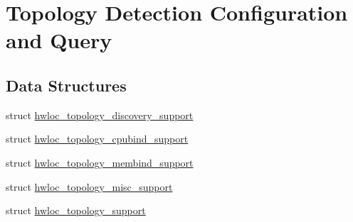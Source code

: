 \hypertarget{a00193}{}\section{Topology Detection Configuration and Query}
\label{a00193}
\subsection*{Data Structures}
\begin{DoxyCompactItemize}
\item 
struct \hyperlink{a00290}{hwloc\+\_\+topology\+\_\+discovery\+\_\+support}
\item 
struct \hyperlink{a00294}{hwloc\+\_\+topology\+\_\+cpubind\+\_\+support}
\item 
struct \hyperlink{a00298}{hwloc\+\_\+topology\+\_\+membind\+\_\+support}
\item 
struct \hyperlink{a00302}{hwloc\+\_\+topology\+\_\+misc\+\_\+support}
\item 
struct \hyperlink{a00306}{hwloc\+\_\+topology\+\_\+support}
\end{DoxyCompactItemize}
